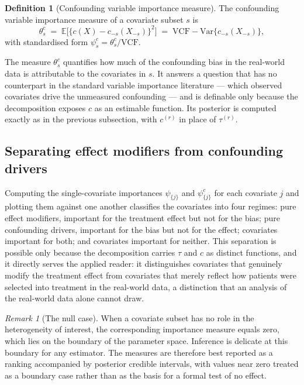 \documentclass[11pt]{report}
\theoremstyle{plain}
\theoremstyle{definition}
\newtheorem{definition}[theorem]{Definition}
\theoremstyle{remark}
\newcommand{\E}{\mathbb{E}}
\newcommand{\1}{\mathds{1}}
\theoremstyle{plain}
\theoremstyle{remark}
\newtheorem{remark}[theorem]{Remark}
\newcommand{\Var}{\mathrm{Var}}
\newcommand{\vcf}{\mathrm{VCF}}
\begin{document}
\begin{definition}[Confounding variable importance measure]
\label{def:cvim}
The confounding variable importance measure of a covariate subset $s$ is
\begin{equation}
\label{eq:cvim}
\theta^{c}_s \;=\; \E\bigl[\{c(X) - c_{-s}(X_{-s})\}^2\bigr]
            \;=\; \vcf - \Var\{c_{-s}(X_{-s})\},
\end{equation}
with standardised form $\psi^{c}_s = \theta^{c}_s / \vcf$.
\end{definition}

\noindent
The measure $\theta^{c}_s$ quantifies how much of the confounding bias in the
real-world data is attributable to the covariates in $s$. It answers a
question that has no counterpart in the standard variable importance literature
--- which observed covariates drive the unmeasured confounding --- and is
definable only because the decomposition exposes $c$ as an estimable function.
Its posterior is computed exactly as in the previous subsection, with $c^{(r)}$
in place of $\tau^{(r)}$.

\subsection{Separating effect modifiers from confounding drivers}
\label{subsec:effmod}

Computing the single-covariate importances $\psi_{\{j\}}$ and $\psi^{c}_{\{j\}}$
for each covariate $j$ and plotting them against one another classifies the
covariates into four regimes: pure effect modifiers, important for the treatment
effect but not for the bias; pure confounding drivers, important for the bias
but not for the effect; covariates important for both; and covariates important
for neither. This separation is possible only because the decomposition carries
$\tau$ and $c$ as distinct functions, and it directly serves the applied reader:
it distinguishes covariates that genuinely modify the treatment effect from
covariates that merely reflect how patients were selected into treatment in the
real-world data, a distinction that an analysis of the real-world data
alone cannot draw.

\begin{remark}[The null case]
\label{rem:null}
When a covariate subset has no role in the heterogeneity of interest, the
corresponding importance measure equals zero, which lies on the boundary of the
parameter space. Inference is delicate at this boundary for any estimator. The
measures are therefore best reported as a ranking accompanied by posterior
credible intervals, with values near zero treated as a boundary case rather than
as the basis for a formal test of no effect.
\end{remark}
\end{document}
